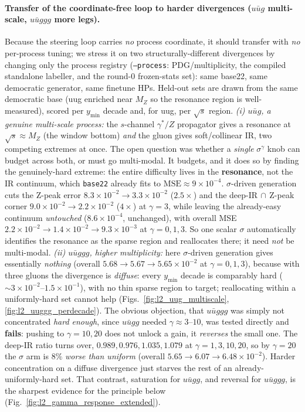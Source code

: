 \documentclass[11pt]{article}
\newcommand{\code}[1]{\texttt{#1}}
\begin{document}
\paragraph{Transfer of the coordinate-free loop to harder divergences ($u\bar u g$ multi-scale,
$u\bar u ggg$ more legs).} Because the steering loop carries \emph{no} process coordinate, it should transfer
with \emph{no} per-process tuning; we stress it on two structurally-different divergences by changing
only the process registry (\code{--process}: PDG/multiplicity, the compiled standalone labeller, and
the round-0 frozen-stats set): same base22, same democratic generator, same finetune HPs. Held-out
sets are drawn from the same democratic base (uug enriched near $M_Z$ so the resonance region is
well-measured), scored per $y_{\min}$ decade and, for uug, per $\sqrt s$ region.
\emph{(i) $u\bar u g$, a genuine multi-scale process:} the $s$-channel $\gamma^\ast/Z$ propagator
gives a resonance at $\sqrt s\!\approx\!M_Z$ (the window bottom) \emph{and} the gluon gives soft/collinear
IR, two competing extremes at once. The open question was whether a \emph{single} $\sigma^\gamma$ knob
can budget across both, or must go multi-modal. It budgets, and it does so by finding the genuinely-hard
extreme: the entire difficulty lives in the \textbf{resonance}, not the IR continuum, which \code{base22}
already fits to $\mathrm{MSE}\!\approx\!9\times10^{-4}$. $\sigma$-driven generation cuts the Z-peak error
$8.3\times10^{-2}\!\to\!3.3\times10^{-2}$ ($2.5\times$) and the deep-IR$\,\cap\,$Z-peak corner
$9.0\times10^{-2}\!\to\!2.2\times10^{-2}$ ($4\times$) at $\gamma{=}3$, while leaving the already-easy
continuum \emph{untouched} ($8.6\times10^{-4}$, unchanged), with overall MSE $2.2\times10^{-2}\to
1.4\times10^{-2}\to9.3\times10^{-3}$ at $\gamma{=}0,1,3$. So one scalar $\sigma$ automatically identifies
the resonance as the sparse region and reallocates there; it need \emph{not} be multi-modal.
\emph{(ii) $u\bar u ggg$, higher multiplicity:} here $\sigma$-driven generation gives essentially
\emph{nothing} (overall $5.68\!\to\!5.67\!\to\!5.65\times10^{-2}$ at $\gamma{=}0,1,3$), because with three
gluons the divergence is \emph{diffuse}: every $y_{\min}$ decade is comparably hard
($\sim\!3\times10^{-2}$--$1.5\times10^{-1}$), with no thin sparse region to target; reallocating within a
uniformly-hard set cannot help (Figs.~\ref{fig:l2_uug_multiscale}, \ref{fig:l2_uuggg_perdecade}).
The obvious objection, that $u\bar u ggg$ was simply not concentrated \emph{hard enough}, since
$u\bar u gg$ needed $\gamma\!\approx\!3$--$10$, was tested directly and \textbf{fails}: pushing to
$\gamma=10,20$ does not unlock a gain, it \emph{reverses} the small one. The deep-IR ratio turns over,
$0.989,0.976,1.035,1.079$ at $\gamma=1,3,10,20$, so by $\gamma{=}20$ the $\sigma$ arm is $8\%$
\emph{worse than uniform} (overall $5.65\!\to\!6.07\!\to\!6.48\times10^{-2}$). Harder concentration on a
diffuse divergence just starves the rest of an already-uniformly-hard set. That contrast, saturation
for $u\bar u gg$, and reversal for $u\bar u ggg$, is the sharpest evidence for the principle below
(Fig.~\ref{fig:l2_gamma_response_extended}).
\end{document}
